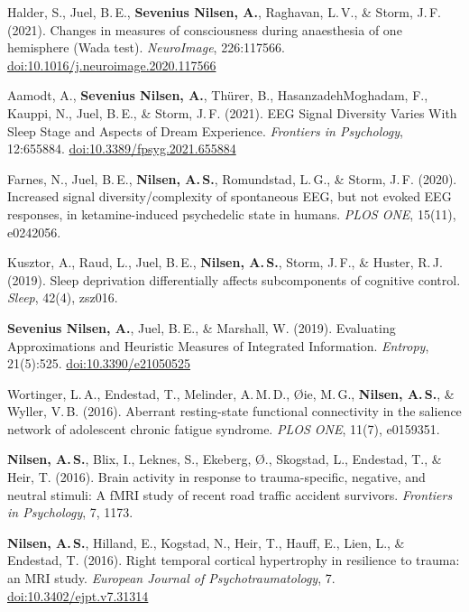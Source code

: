 \documentclass[11pt, a4paper]{article}
\begin{document}
\begin{enumerate}[leftmargin=2em, label={[\arabic*]}, itemsep=0.4em]
  \item Halder, S., Juel, B.\,E., \textbf{Sevenius Nilsen, A.}, Raghavan, L.\,V., \& Storm, J.\,F. (2021).
        Changes in measures of consciousness during anaesthesia of one hemisphere (Wada test).
        \textit{NeuroImage}, 226:117566.
        \href{https://doi.org/10.1016/j.neuroimage.2020.117566}{doi:10.1016/j.neuroimage.2020.117566}

  \item Aamodt, A., \textbf{Sevenius Nilsen, A.}, Th\"urer, B., HasanzadehMoghadam, F.,
        Kauppi, N., Juel, B.\,E., \& Storm, J.\,F. (2021).
        EEG Signal Diversity Varies With Sleep Stage and Aspects of Dream Experience.
        \textit{Frontiers in Psychology}, 12:655884.
        \href{https://doi.org/10.3389/fpsyg.2021.655884}{doi:10.3389/fpsyg.2021.655884}

  \item Farnes, N., Juel, B.\,E., \textbf{Nilsen, A.\,S.}, Romundstad, L.\,G., \& Storm, J.\,F. (2020).
        Increased signal diversity/complexity of spontaneous EEG, but not evoked EEG responses,
        in ketamine-induced psychedelic state in humans.
        \textit{PLOS ONE}, 15(11), e0242056.

  \item Kusztor, A., Raud, L., Juel, B.\,E., \textbf{Nilsen, A.\,S.}, Storm, J.\,F., \& Huster, R.\,J. (2019).
        Sleep deprivation differentially affects subcomponents of cognitive control.
        \textit{Sleep}, 42(4), zsz016.

  \item \textbf{Sevenius Nilsen, A.}, Juel, B.\,E., \& Marshall, W. (2019).
        Evaluating Approximations and Heuristic Measures of Integrated Information.
        \textit{Entropy}, 21(5):525.
        \href{https://doi.org/10.3390/e21050525}{doi:10.3390/e21050525}

  \item Wortinger, L.\,A., Endestad, T., Melinder, A.\,M.\,D., \O ie, M.\,G.,
        \textbf{Nilsen, A.\,S.}, \& Wyller, V.\,B. (2016).
        Aberrant resting-state functional connectivity in the salience network of adolescent
        chronic fatigue syndrome.
        \textit{PLOS ONE}, 11(7), e0159351.

  \item \textbf{Nilsen, A.\,S.}, Blix, I., Leknes, S., Ekeberg, \O ., Skogstad, L.,
        Endestad, T., \& Heir, T. (2016).
        Brain activity in response to trauma-specific, negative, and neutral stimuli:
        A fMRI study of recent road traffic accident survivors.
        \textit{Frontiers in Psychology}, 7, 1173.

  \item \textbf{Nilsen, A.\,S.}, Hilland, E., Kogstad, N., Heir, T., Hauff, E., Lien, L.,
        \& Endestad, T. (2016).
        Right temporal cortical hypertrophy in resilience to trauma: an MRI study.
        \textit{European Journal of Psychotraumatology}, 7.
        \href{http://doi.org/10.3402/ejpt.v7.31314}{doi:10.3402/ejpt.v7.31314}

\end{enumerate}
\end{document}
